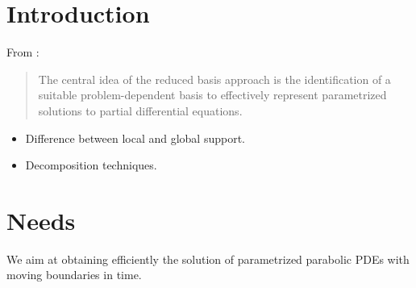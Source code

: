 \documentclass[../main.tex]{subfiles}
\begin{document}

        




\section{Introduction}

From  \cite{2016_CertifiedReducedBasisMethodsParametrizedPDE_Hesthaven}:
\begin{quotation}
    The central idea of the reduced basis approach is the identification of a suitable problem-dependent basis to effectively represent parametrized solutions to partial differential equations.
\end{quotation}

\begin{itemize}
    \item Difference between local and global support.
    \item Decomposition techniques.
\end{itemize}

\section{Needs}
We aim at obtaining efficiently the solution of parametrized parabolic PDEs with moving boundaries in time.
\end{document}
